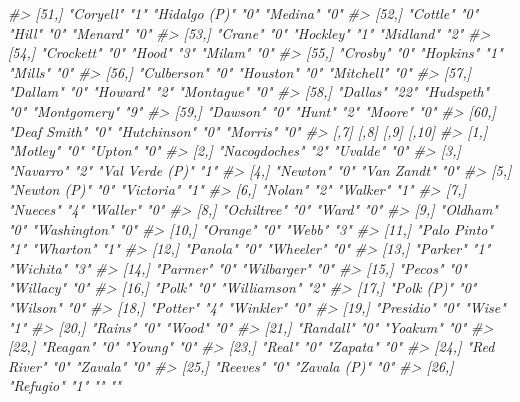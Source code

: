 \documentclass[
  12pt,
]{book}
\newenvironment{Shaded}{\begin{snugshade}}{\end{snugshade}}
\newcommand{\CommentTok}[1]{\textcolor[rgb]{0.56,0.35,0.01}{\textit{#1}}}
\begin{document}
\begin{Shaded}
\begin{Highlighting}[]
\CommentTok{\#> [51,] "Coryell"       "1"  "Hidalgo (P)" "0"  "Medina"        "0" }
\CommentTok{\#> [52,] "Cottle"        "0"  "Hill"        "0"  "Menard"        "0" }
\CommentTok{\#> [53,] "Crane"         "0"  "Hockley"     "1"  "Midland"       "2" }
\CommentTok{\#> [54,] "Crockett"      "0"  "Hood"        "3"  "Milam"         "0" }
\CommentTok{\#> [55,] "Crosby"        "0"  "Hopkins"     "1"  "Mills"         "0" }
\CommentTok{\#> [56,] "Culberson"     "0"  "Houston"     "0"  "Mitchell"      "0" }
\CommentTok{\#> [57,] "Dallam"        "0"  "Howard"      "2"  "Montague"      "0" }
\CommentTok{\#> [58,] "Dallas"        "22" "Hudspeth"    "0"  "Montgomery"    "9" }
\CommentTok{\#> [59,] "Dawson"        "0"  "Hunt"        "2"  "Moore"         "0" }
\CommentTok{\#> [60,] "Deaf Smith"    "0"  "Hutchinson"  "0"  "Morris"        "0" }
\CommentTok{\#>       [,7]            [,8] [,9]            [,10]}
\CommentTok{\#>  [1,] "Motley"        "0"  "Upton"         "0"  }
\CommentTok{\#>  [2,] "Nacogdoches"   "2"  "Uvalde"        "0"  }
\CommentTok{\#>  [3,] "Navarro"       "2"  "Val Verde (P)" "1"  }
\CommentTok{\#>  [4,] "Newton"        "0"  "Van Zandt"     "0"  }
\CommentTok{\#>  [5,] "Newton (P)"    "0"  "Victoria"      "1"  }
\CommentTok{\#>  [6,] "Nolan"         "2"  "Walker"        "1"  }
\CommentTok{\#>  [7,] "Nueces"        "4"  "Waller"        "0"  }
\CommentTok{\#>  [8,] "Ochiltree"     "0"  "Ward"          "0"  }
\CommentTok{\#>  [9,] "Oldham"        "0"  "Washington"    "0"  }
\CommentTok{\#> [10,] "Orange"        "0"  "Webb"          "3"  }
\CommentTok{\#> [11,] "Palo Pinto"    "1"  "Wharton"       "1"  }
\CommentTok{\#> [12,] "Panola"        "0"  "Wheeler"       "0"  }
\CommentTok{\#> [13,] "Parker"        "1"  "Wichita"       "3"  }
\CommentTok{\#> [14,] "Parmer"        "0"  "Wilbarger"     "0"  }
\CommentTok{\#> [15,] "Pecos"         "0"  "Willacy"       "0"  }
\CommentTok{\#> [16,] "Polk"          "0"  "Williamson"    "2"  }
\CommentTok{\#> [17,] "Polk (P)"      "0"  "Wilson"        "0"  }
\CommentTok{\#> [18,] "Potter"        "4"  "Winkler"       "0"  }
\CommentTok{\#> [19,] "Presidio"      "0"  "Wise"          "1"  }
\CommentTok{\#> [20,] "Rains"         "0"  "Wood"          "0"  }
\CommentTok{\#> [21,] "Randall"       "0"  "Yoakum"        "0"  }
\CommentTok{\#> [22,] "Reagan"        "0"  "Young"         "0"  }
\CommentTok{\#> [23,] "Real"          "0"  "Zapata"        "0"  }
\CommentTok{\#> [24,] "Red River"     "0"  "Zavala"        "0"  }
\CommentTok{\#> [25,] "Reeves"        "0"  "Zavala (P)"    "0"  }
\CommentTok{\#> [26,] "Refugio"       "1"  ""              ""   }

\end{Highlighting}
\end{Shaded}
\end{document}
